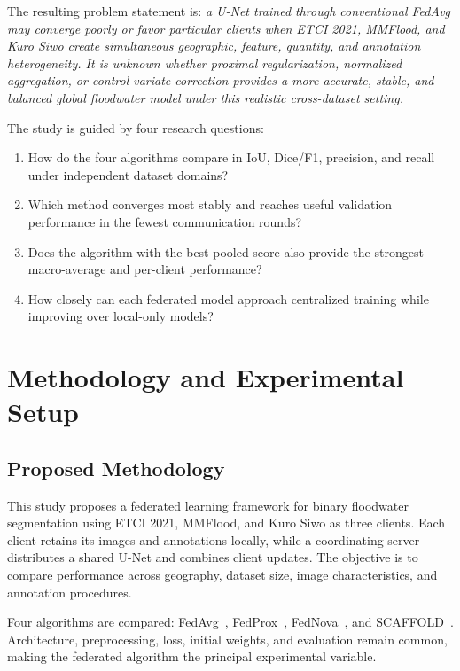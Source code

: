\documentclass[conference]{IEEEtran}
\begin{document}
The resulting problem statement is: \textit{a U-Net trained through conventional FedAvg may converge poorly or favor particular clients when ETCI 2021, MMFlood, and Kuro Siwo create simultaneous geographic, feature, quantity, and annotation heterogeneity. It is unknown whether proximal regularization, normalized aggregation, or control-variate correction provides a more accurate, stable, and balanced global floodwater model under this realistic cross-dataset setting.}

The study is guided by four research questions:
\begin{enumerate}
    \item[\textbf{RQ1:}] How do the four algorithms compare in IoU, Dice/F1, precision, and recall under independent dataset domains?
    \item[\textbf{RQ2:}] Which method converges most stably and reaches useful validation performance in the fewest communication rounds?
    \item[\textbf{RQ3:}] Does the algorithm with the best pooled score also provide the strongest macro-average and per-client performance?
    \item[\textbf{RQ4:}] How closely can each federated model approach centralized training while improving over local-only models?
\end{enumerate}

\section{Methodology and Experimental Setup}

\subsection{Proposed Methodology}
This study proposes a federated learning framework for binary floodwater segmentation using ETCI 2021, MMFlood, and Kuro Siwo as three clients. Each client retains its images and annotations locally, while a coordinating server distributes a shared U-Net and combines client updates. The objective is to compare performance across geography, dataset size, image characteristics, and annotation procedures.

Four algorithms are compared: FedAvg~\cite{mcmahan2017communication}, FedProx~\cite{li2020federated}, FedNova~\cite{wang2020tackling}, and SCAFFOLD~\cite{karimireddy2020scaffold}. Architecture, preprocessing, loss, initial weights, and evaluation remain common, making the federated algorithm the principal experimental variable.
\end{document}
